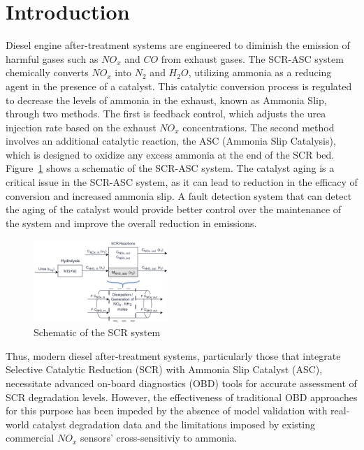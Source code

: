 \section{Introduction}

Diesel engine after-treatment systems are engineered to diminish the emission of
harmful gases such as $NO_x$ and $CO$ from exhaust gases. The SCR-ASC system
chemically converts $NO_x$ into $N_2$ and $H_2O$, utilizing ammonia as a reducing agent
in the presence of a catalyst. This catalytic conversion process is regulated to
decrease the levels of ammonia in the exhaust, known as Ammonia Slip, through
two methods. The first is feedback control, which adjusts the urea injection
rate based on the exhaust $NO_x$ concentrations. The second method involves an
additional catalytic reaction, the ASC (Ammonia Slip Catalysis), which is
designed to oxidize any excess ammonia at the end of the SCR bed.
Figure~\ref{fig:exhaust_scheme} shows a schematic of the SCR-ASC system. The
catalyst aging is a critical issue in the SCR-ASC system, as it can lead to
reduction in the efficacy of conversion and increased ammonia slip. A
fault detection system that can detect the aging of the catalyst would provide
better control over the maintenance of the system and improve the overall
reduction in emissions.

\begin{figure}[ht]
    \centering
    \includegraphics[width=0.45\textwidth]{./figs/scr_system.png}
    \caption{Schematic of the SCR system}
    \label{fig:exhaust_scheme}
\end{figure}


Thus, modern diesel after-treatment systems, particularly those that integrate
Selective Catalytic Reduction (SCR) with Ammonia Slip Catalyst (ASC),
necessitate advanced on-board diagnostics (OBD) tools for accurate assessment of
SCR degradation levels. However, the effectiveness of traditional OBD approaches
for this purpose has been impeded by the absence of model validation with
real-world catalyst degradation data and the limitations imposed by existing
commercial $NO_x$ sensors' cross-sensitiviy to ammonia.

